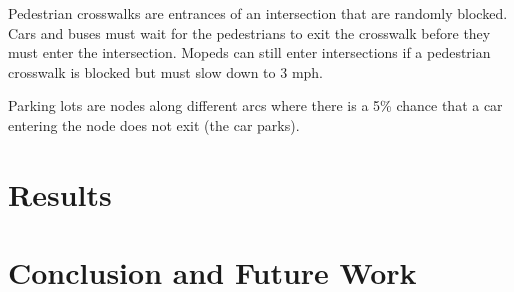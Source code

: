 \documentclass[conference]{IEEEtran}
\begin{document}
Pedestrian crosswalks are entrances of an intersection that are randomly blocked.
Cars and buses must wait for the pedestrians to exit the crosswalk before they must enter the intersection.
Mopeds can still enter intersections if a pedestrian crosswalk is blocked but must slow down to 3 mph.

Parking lots are nodes along different arcs where there is a 5\% chance that a car entering the node does not exit (the car parks).


\section{Results}


\section{Conclusion and Future Work}
\end{document}
